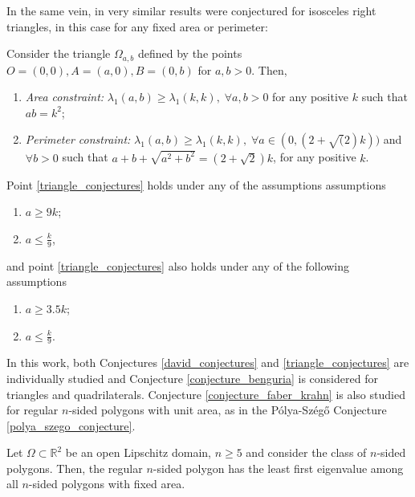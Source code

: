 In the same vein, in \cite{vu2023spectral} very similar results were conjectured for isosceles right triangles, in this case for any fixed area or perimeter:

\begin{conjecture}\label{triangle_conjectures}
    Consider the triangle \(\Omega_{a, b}\) defined by the points \(O=(0, 0), A=(a, 0), B=(0, b)\) for \(a, b>0\). Then, 
    \begin{enumerate}
        \item \textit{Area constraint: } \(\lambda_1(a, b) \geq \lambda_1(k, k),\; \forall a, b>0\) for any positive \(k\) such that \(ab=k^2\);
        \item \textit{Perimeter constraint: } \(\lambda_1(a, b) \geq \lambda_1(k, k),\; \forall a \in (0, (2+\sqrt(2)k))\) and \(\forall b > 0\) such that \(a+b+\sqrt{a^2+b^2}=(2+\sqrt{2})k\), for any positive \(k\).
    \end{enumerate}
    Point \ref{triangle_conjectures} holds under any of the assumptions assumptions
    \begin{enumerate}
        \item \(a \geq 9k\);
        \item \(a \leq \frac{k}{9}\),
    \end{enumerate}
    and point \ref{triangle_conjectures} also holds under any of the following assumptions
    \begin{enumerate}
        \item \(a \geq 3.5k\);
        \item \(a \leq \frac{k}{9}\).
    \end{enumerate}
\end{conjecture}

In this work, both Conjectures \ref{david_conjectures} and \ref{triangle_conjectures} are individually studied and Conjecture \ref{conjecture_benguria} is considered for triangles and quadrilaterals. Conjecture \ref{conjecture_faber_krahn} is also studied for regular \(n\)-sided polygons with unit area, as in the Pólya-Szég\H{o} Conjecture \ref{polya_szego_conjecture}.

\begin{conjecture}\label{polya_szego_conjecture_dirac}
    Let \(\Omega \subset \mathbb{R}^2\) be an open Lipschitz domain, \(n \geq 5\) and consider the class of \(n\)-sided polygons. Then, the regular \(n\)-sided polygon has the least first eigenvalue among all \(n\)-sided polygons with fixed area.
\end{conjecture}

